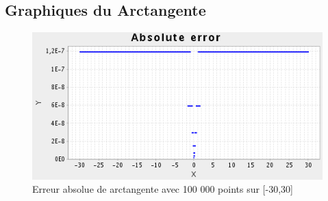 \documentclass[12pt]{article}
\begin{document}
\subsection{Graphiques du Arctangente}

\begin{figure}[h!]
  \begin{center}
    \includegraphics[scale=0.33]{atan_abs.png}
    \caption{Erreur absolue de arctangente avec 100 000 points sur [-30,30]}
    \label{Erreur absolue de arctangente avec 100 000 points sur [-30,30]}
  \end{center}
\end{figure}
\end{document}
